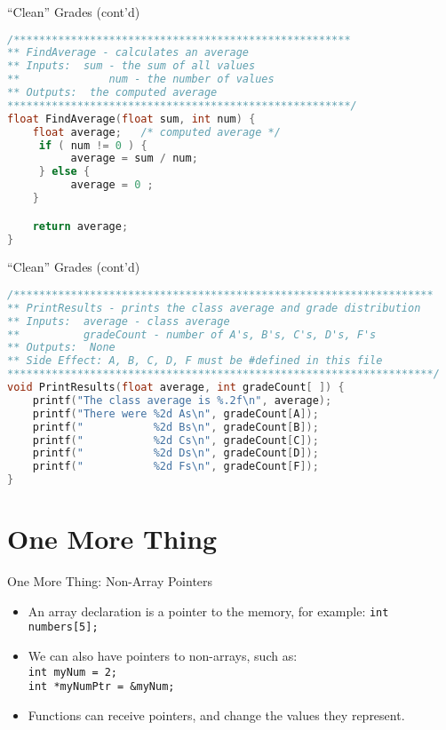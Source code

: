 \documentclass[graphics]{beamer}
\begin{document}
\begin{frame}[fragile]{``Clean'' Grades (cont'd)}
    \begin{lstlisting}[language=C,basicstyle=\scriptsize,keywordstyle=\color{blue},commentstyle=\color{green},showstringspaces=false,stringstyle=\color{red}]
/*****************************************************
** FindAverage - calculates an average
** Inputs:  sum - the sum of all values
**              num - the number of values
** Outputs:  the computed average
******************************************************/
float FindAverage(float sum, int num) {
    float average;   /* computed average */
     if ( num != 0 ) {
          average = sum / num;
     } else {
          average = 0 ;
    }

    return average;
}
    \end{lstlisting}
\end{frame}

\begin{frame}[fragile]{``Clean'' Grades (cont'd)}
    \begin{lstlisting}[language=C,basicstyle=\scriptsize,keywordstyle=\color{blue},commentstyle=\color{green},showstringspaces=false,stringstyle=\color{red}]
/******************************************************************
** PrintResults - prints the class average and grade distribution
** Inputs:  average - class average
**          gradeCount - number of A's, B's, C's, D's, F's
** Outputs:  None
** Side Effect: A, B, C, D, F must be #defined in this file
*******************************************************************/
void PrintResults(float average, int gradeCount[ ]) {
    printf("The class average is %.2f\n", average);
    printf("There were %2d As\n", gradeCount[A]);
    printf("           %2d Bs\n", gradeCount[B]);
    printf("           %2d Cs\n", gradeCount[C]);
    printf("           %2d Ds\n", gradeCount[D]);
    printf("           %2d Fs\n", gradeCount[F]);
}
    \end{lstlisting}
\end{frame}

\appendix
\section*{One More Thing}
\begin{frame}[fragile]{One More Thing: Non-Array Pointers}
    \begin{itemize}
        \item An array declaration is a pointer to the memory, for example: \texttt{int numbers[5];}
        \item We can also have pointers to non-arrays, such as: \\
        \texttt{int myNum = 2;}\\
        \texttt{int *myNumPtr = \&myNum;}
        \item Functions can receive pointers, and change the values they represent.
    \end{itemize}
\end{frame}
\end{document}
